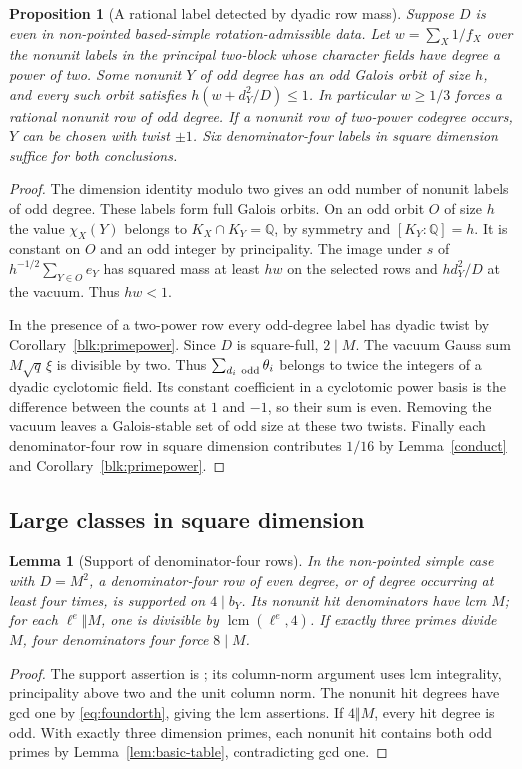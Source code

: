\documentclass[11pt]{amsart}
\numberwithin{equation}{section}
\newtheorem{lemma}[theorem]{Lemma}
\newtheorem{proposition}[theorem]{Proposition}
\theoremstyle{definition}
\theoremstyle{plain}
\DeclareMathOperator{\lcm}{lcm}
\newcommand{\QQ}{\mathbb Q}
\begin{document}
\begin{proposition}[A rational label detected by dyadic row mass]\label{new:dyadic-mass-witness}
Suppose $D$ is even in non-pointed based-simple rotation-admissible data. Let
$w=\sum_X1/f_X$ over the nonunit labels in the principal two-block
whose character fields have degree a power of two. Some nonunit
$Y$ of odd degree has an odd Galois orbit of size $h$, and every such
orbit satisfies $h(w+d_Y^2/D)\le1$. In particular $w\ge1/3$
forces a rational nonunit row of odd degree. If a nonunit row of
two-power codegree occurs, $Y$ can be chosen with twist $\pm1$.
Six denominator-four labels in square dimension suffice for both conclusions.
\end{proposition}
\begin{proof}
The dimension identity modulo two gives an odd number of nonunit labels
of odd degree. These labels form full Galois orbits. On an odd orbit
$O$ of size $h$ the value $\chi_X(Y)$ belongs to $K_X\cap K_Y=\QQ$,
by symmetry and $[K_Y:\QQ]=h$. It is constant on $O$ and an odd integer
by principality. The image under $s$ of $h^{-1/2}\sum_{Y\in O}e_Y$
has squared mass at least $hw$ on the selected rows and $h d_Y^2/D$
at the vacuum. Thus $hw<1$.

In the presence of a two-power row every odd-degree label has dyadic
twist by Corollary~\ref{blk:primepower}. Since $D$ is square-full,
$2\mid M$. The vacuum Gauss sum $M\sqrt q\,\xi$ is divisible by two.
Thus $\sum_{d_i\ {\rm odd}}\theta_i$ belongs to twice the integers
of a dyadic cyclotomic field. Its constant coefficient in a cyclotomic
power basis is the difference between the counts at $1$ and $-1$,
so their sum is even. Removing the vacuum leaves a Galois-stable
set of odd size at these two twists. Finally each denominator-four
row in square dimension contributes $1/16$ by Lemma~\ref{conduct}
and Corollary~\ref{blk:primepower}.
\end{proof}

\subsection{Large classes in square dimension}
\begin{lemma}[Support of denominator-four rows]\label{sq:heights}
In the non-pointed simple case with $D=M^2$, a denominator-four row
of even degree, or of degree occurring at least four times, is
supported on $4\mid b_Y$. Its nonunit hit denominators have lcm $M$;
for each $\ell^e\Vert M$, one is divisible by $\lcm(\ell^e,4)$.
If exactly three primes divide $M$, four denominators four force
$8\mid M$.
\end{lemma}
\begin{proof}
The support assertion is \cite[\S21.2 and Lemma~21.6]{BDPcore}; its
column-norm argument uses lcm integrality, principality above two
and the unit column norm. The nonunit hit degrees have gcd one by
\eqref{eq:foundorth}, giving the lcm assertions.
If $4\Vert M$, every hit degree is odd. With exactly three dimension
primes, each nonunit hit contains both odd primes by
Lemma~\ref{lem:basic-table}, contradicting gcd one.
\end{proof}
\end{document}
